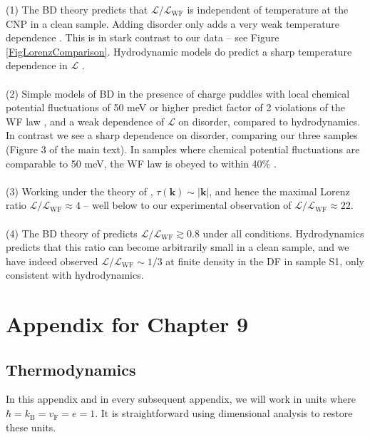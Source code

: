 \documentclass[10pt, oneside]{book}
\begin{document}
\begin{doublespace}
\begin{appendix}
\noindent (1) The BD theory predicts that   $\mathcal{L}/\mathcal{L}_{\mathrm{WF}}$ is independent of temperature at the CNP in a clean sample.    Adding disorder only adds a very weak temperature dependence \cite{yoshino}.  This is in stark contrast to our data -- see Figure \ref{FigLorenzComparison}.   Hydrodynamic models do predict a sharp temperature dependence in $\mathcal{L}$ \cite{Lucas:2015sya}.
\\\\
\noindent (2) Simple models of BD in the presence of charge puddles with local chemical potential fluctuations of 50 meV or higher predict factor of 2 violations of the WF law \cite{yoshino}, and a weak dependence of $\mathcal{L}$ on disorder, compared to hydrodynamics.   In contrast we see a sharp dependence on disorder, comparing our three samples (Figure 3 of the main text).   In samples where chemical potential fluctuations are comparable to 50 meV, the WF law is obeyed to within 40\% \cite{fong}.
\\\\
\noindent (3) Working under the theory of \cite{sarma2009}, $\tau(\mathbf{k}) \sim |\mathbf{k}|$, and hence the maximal Lorenz ratio $\mathcal{L}/\mathcal{L}_{\mathrm{WF}}\approx 4$ \cite{yoshino}  -- well below to our experimental observation of $\mathcal{L}/\mathcal{L}_{\mathrm{WF}}\approx 22$.
\\\\
\noindent (4) The BD theory of \cite{yoshino} predicts $\mathcal{L}/\mathcal{L}_{\mathrm{WF}} \gtrsim 0.8$ under all conditions.   Hydrodynamics predicts that this ratio can become arbitrarily small in a clean sample, and we have indeed observed $\mathcal{L}/\mathcal{L}_{\mathrm{WF}} \sim 1/3$ at finite density in the DF in sample S1, only consistent with hydrodynamics.



\chapter{Appendix for Chapter 9}

\section{Thermodynamics}\label{appthermo}
In this appendix and in every subsequent appendix, we will work in units where $\hbar=k_{\mathrm{B}}=v_{\mathrm{F}}=e=1$.     It is straightforward using dimensional analysis to restore these units.  


\end{appendix}
\end{doublespace}
\end{document}
